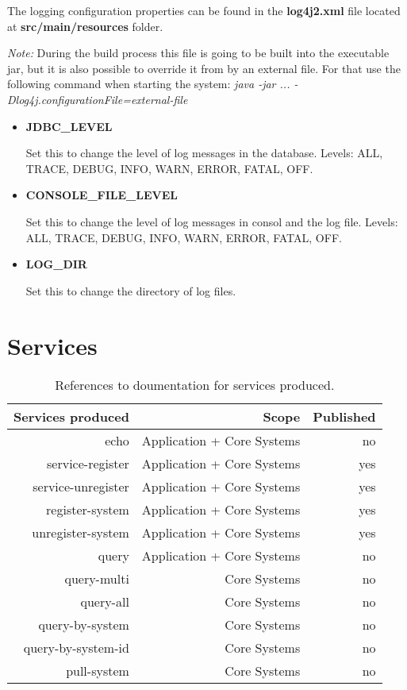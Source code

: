 \documentclass[a4paper]{arrowhead}
\begin{document}
The logging configuration properties can be found in the \textbf{log4j2.xml} file located at \textbf{src/main/resources} folder.

\textit{Note:} During the build process this file is going to be built into the executable jar, but it is also possible to override it from by an external file. For that use the following command when starting the system: \textit{java -jar ... -Dlog4j.configurationFile={external-file}}

\begin{itemize}
    \item \textbf{JDBC\_LEVEL}
    
    Set this to change the level of log messages in the database. Levels: ALL, TRACE, DEBUG, INFO, WARN, ERROR, FATAL, OFF.
    
    \item \textbf{CONSOLE\_FILE\_LEVEL}
    
    Set this to change the level of log messages in consol and the log file. Levels: ALL, TRACE, DEBUG, INFO, WARN, ERROR, FATAL, OFF.
    
    \item \textbf{LOG\_DIR}
    
    Set this to change the directory of log files.
\end{itemize}
  
\newpage

\section{Services}
\label{sec:services}

\begin{table*}[ht!]
  \centering
  \caption{References to doumentation for services produced. }
  \label{tab:services}
  \begin{tabular}{|r|r|r|}
    \hline
    \rowcolor{gray!33}\textbf{Services produced} & \textbf{Scope} & \textbf{Published} \\
    \hline
 
    echo & Application + Core Systems & no \\ \hline
    service-register & Application + Core Systems & yes\\ \hline
    service-unregister & Application + Core Systems & yes\\ \hline
    register-system & Application + Core Systems & yes\\ \hline
    unregister-system & Application + Core Systems & yes\\ \hline
    query & Application + Core Systems & no\\ \hline
    query-multi & Core Systems & no\\ \hline
    query-all & Core Systems & no\\ \hline
    query-by-system & Core Systems & no\\ \hline
    query-by-system-id &Core Systems & no\\ \hline
    pull-system &Core Systems & no\\ \hline
  \end{tabular}
\end{table*}
\end{document}

